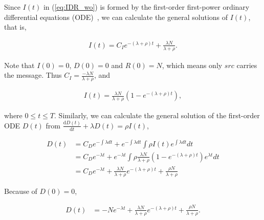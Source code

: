 Since $I(t)$ in (\ref{eq:IDR_wo}) is formed by the first-order first-power
ordinary differential equations (ODE)~\cite{CC2007PerfAnaly},
we can calculate the general solutions of $I(t)$, that is,
\begin{small}
\begin{equation}
\nonumber
\begin{aligned}
I(t) = C_{I} e^{-(\lambda + \rho)t} + \frac{ \lambda N }{ \lambda + \rho }.
\end{aligned}
\end{equation}
\end{small}
Note that $I(0)=0$, $D(0)=0$ and $R(0)=N$,
which means only $src$ carries the message.
Thus $C_{I} = \frac{ -\lambda N }{ \lambda + \rho }$, and
\begin{small}
\begin{equation}
\nonumber
\begin{aligned}
I(t) = \frac{ \lambda N }{ \lambda + \rho }(1- e^{-(\lambda + \rho)t}),
\end{aligned}
\end{equation}
\end{small}
where $0 \le t \le T$.
Similarly, we can calculate the general solution of the first-order ODE $D(t)$
from $\frac{\mathrm{d} D(t)}{\mathrm{d} t} + \lambda D(t) = \rho I(t)$,
\begin{small}
\begin{equation}
\nonumber
\begin{aligned}
D(t) &= C_{D} e^{-\int \lambda dt} + e^{-\int \lambda dt} \int \rho I(t) e^{\int \lambda dt} dt \\
&= C_{D} e^{- \lambda t} +
e^{- \lambda t} \int \rho \frac{ \lambda N }{ \lambda + \rho } (1 - e^{-(\lambda + \rho)t}) e^{ \lambda t} dt \\
&= C_{D} e^{- \lambda t} + \frac{ \lambda N }{ \lambda + \rho } e^{-(\lambda + \rho)t} + \frac{ \rho N }{ \lambda + \rho }
\end{aligned}
\end{equation}
\end{small}
Because of $D(0)=0$,
\begin{small}
\begin{equation}
\nonumber
\begin{aligned}
D(t) &= -N e^{- \lambda t} + \frac{ \lambda N }{ \lambda + \rho } e^{-(\lambda + \rho)t} + \frac{ \rho N }{ \lambda + \rho }.
\end{aligned}
\end{equation}
\end{small}
